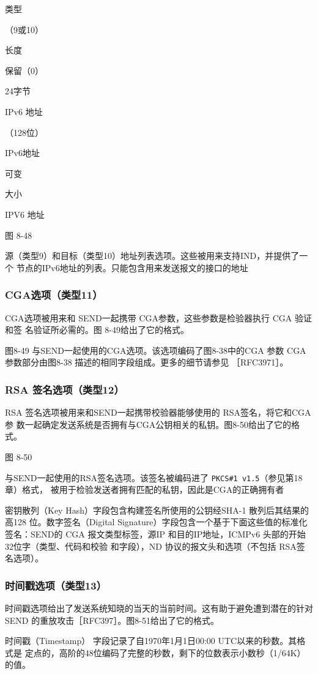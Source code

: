 类型

（9或10）

长度

保留（0）

24字节

IPv6 地址

（128位）

IPv6地址

可变

大小

IPV6 地址

图 8-48

源（类型9）和目标（类型10）地址列表选项。这些被用来支持IND，并提供了一个
节点的IPv6地址的列表。只能包含用来发送报文的接口的地址

\subsubsection{CGA选项（类型11）}
CGA选项被用来和 SEND一起携带 CGA参数，这些参数是检验器执行 CGA 验证和签
名验证所必需的。图 8-49给出了它的格式。


图8-49 与SEND一起使用的CGA选项。该选项编码了图8-38中的CGA 参数
CGA 参数部分由图8-38 描述的相同字段组成。更多的细节请参见 ［RFC3971］。

\subsubsection{RSA 签名选项（类型12）}
RSA 签名选项被用来和SEND一起携带校验器能够使用的 RSA签名，将它和CGA参
数一起确定发送系统是否拥有与CGA公钥相关的私钥。图8-50给出了它的格式。


图 8-50

与SEND一起使用的RSA签名选项。该签名被编码进了 \verb|PKCS#1 v1.5|（参见第18章）格式，
被用于检验发送者拥有匹配的私钥，因此是CGA的正确拥有者

密钥散列（Key Hash）字段包含构建签名所使用的公钥经SHA-1 散列后其结果的高128
位。数字签名（Digital Signature）字段包含一个基于下面这些值的标准化签名：SEND的
CGA 报文类型标签，源IP 和目的IP地址，ICMPv6 头部的开始32位字（类型、代码和校验
和字段），ND 协议的报文头和选项（不包括 RSA签名选项）。

\subsubsection{时间戳选项（类型13）}
时间戳选项给出了发送系统知晓的当天的当前时间。这有助于避免遭到潜在的针对
SEND 的重放攻击［RFC397］。图8-51给出了它的格式。

时间戳（Timestamp） 字段记录了自1970年1月1日00:00 UTC以来的秒数。其格式是
定点的，高阶的48位编码了完整的秒数，剩下的位数表示小数秒（1/64K）的值。

